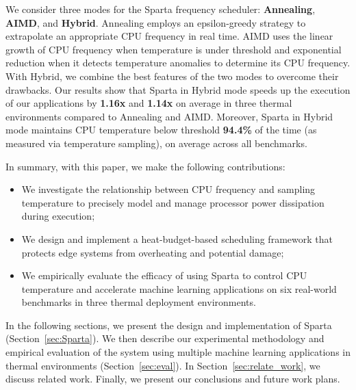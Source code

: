 
We consider three modes for the Sparta frequency scheduler: \textbf{Annealing}, \textbf{AIMD}, and \textbf{Hybrid}.  Annealing employs an epsilon-greedy strategy to extrapolate an appropriate CPU frequency in real time. AIMD uses the linear growth of CPU frequency when temperature is under threshold and exponential reduction when it detects temperature anomalies to determine its CPU frequency.  With Hybrid, we combine the best features of the two modes to overcome their drawbacks. Our results show that Sparta in Hybrid mode speeds up the execution of our applications by \textbf{1.16x} and \textbf{1.14x} on average in three thermal environments compared to Annealing and AIMD. Moreover, Sparta in Hybrid mode maintains CPU temperature below threshold \textbf{94.4\%} of the time (as measured via temperature sampling), on average across all benchmarks. 

In summary, with this paper, we make the following contributions:
\begin{itemize}
    \item We investigate the relationship between CPU frequency and sampling temperature to precisely model and manage processor power dissipation during execution;
    \vspace{1mm}
    \item We design and implement a heat-budget-based scheduling framework that protects edge systems from overheating and potential damage;
    \vspace{1mm}
    \item We empirically evaluate the efficacy of using Sparta to control CPU temperature and accelerate machine learning applications on six real-world benchmarks in three thermal deployment environments. 
\end{itemize}

In the following sections, we present the design and implementation of Sparta (Section~\ref{sec:Sparta}). We then describe our experimental methodology and empirical evaluation of the system using multiple machine learning applications in thermal environments (Section~\ref{sec:eval}). In Section~\ref{sec:relate_work},  we discuss related work. Finally, we present our conclusions and future work plans.



